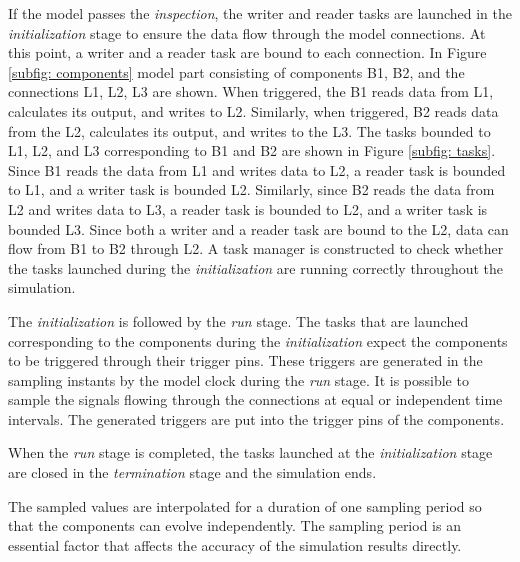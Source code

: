 If the model passes the \textit{inspection}, the writer and reader tasks are launched in the \textit{initialization} stage to ensure the data flow through the model connections. At this point, a writer and a reader task are bound to each connection. In Figure \ref{subfig: components} model part consisting of components B1, B2, and the connections L1, L2, L3 are shown. When triggered, the B1 reads data from L1, calculates its output, and writes to L2. Similarly, when triggered, B2 reads data from the L2, calculates its output, and writes to the L3. The tasks bounded to L1, L2, and L3 corresponding to B1 and B2 are shown in Figure \ref{subfig: tasks}. Since B1 reads the data from L1 and writes data to L2, a reader task is bounded to L1, and a writer task is bounded L2. Similarly, since B2 reads the data from L2 and writes data to L3, a reader task is bounded to L2, and a writer task is bounded L3. Since both a writer and a reader task are bound to the L2, data can flow from B1 to B2 through L2. A task manager is constructed to check whether the tasks launched during the \textit{initialization} are running correctly throughout the simulation.

The \textit{initialization} is followed by the \textit{run} stage. The tasks that are launched corresponding to the components during the \textit{initialization} expect the components to be triggered through their trigger pins. These triggers are generated in the sampling instants by the model clock during the \textit{run} stage. It is possible to sample the signals flowing through the connections at equal or independent time intervals. The generated triggers are put into the trigger pins of the components.

When the \textit{run} stage is completed, the tasks launched at the \textit{initialization} stage are closed in the \textit{termination} stage and the simulation ends.

The sampled values are interpolated for a duration of one sampling period so that the components can evolve independently. The sampling period is an essential factor that affects the accuracy of the simulation results directly.